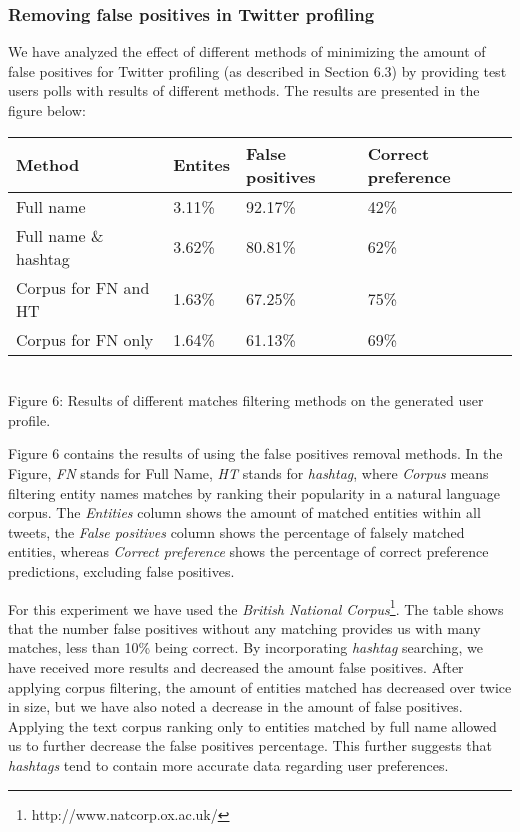 \subsubsection{Removing false positives in Twitter profiling}

We have analyzed the effect of different methods of minimizing the amount of false
positives for Twitter profiling (as described in Section 6.3) by providing test users
polls with results of different methods. The results are presented in the figure below:

\begin{center}
  \begin{tabular}{ | p{4cm} | p{2cm} | p{2cm} | p{2cm} | } \hline
    Method & Entites & False positives & Correct preference \\ \hline
    Full name & 3.11\% & 92.17\% & 42\% \\ \hline
    Full name \& hashtag & 3.62\% & 80.81\% & 62\% \\ \hline
    Corpus for FN and HT & 1.63\% & 67.25\% & 75\% \\ \hline
    Corpus for FN only & 1.64\% & 61.13\% & 69\% \\ \hline
  \end{tabular} \\
  Figure 6: Results of different matches filtering methods on the generated user profile.
\end{center}

Figure 6 contains the results of using the false positives removal methods. In the Figure,
\textit{FN} stands for Full Name, \textit{HT} stands for \textit{hashtag}, where \textit{Corpus}
means filtering entity names matches by ranking their popularity in a natural language
corpus. The \textit{Entities} column shows the amount of matched entities within all tweets,
the \textit{False positives} column shows the percentage of falsely matched
entities, whereas \textit{Correct preference} shows the percentage of correct preference predictions,
excluding false positives.

For this experiment we have used the \textit{British National Corpus}\footnote{http://www.natcorp.ox.ac.uk/}.
The table shows that the number false positives without any matching provides us with many matches, less than
10\% being correct. By incorporating \textit{hashtag} searching, we have received more results and decreased the amount
false positives. After applying corpus filtering, the amount of entities matched has decreased over twice in size,
but we have also noted a decrease in the amount of false positives. Applying the text corpus ranking only to
entities matched by full name allowed us to further decrease the false positives percentage.
This further suggests that \textit{hashtags} tend to contain more accurate data regarding user preferences.

